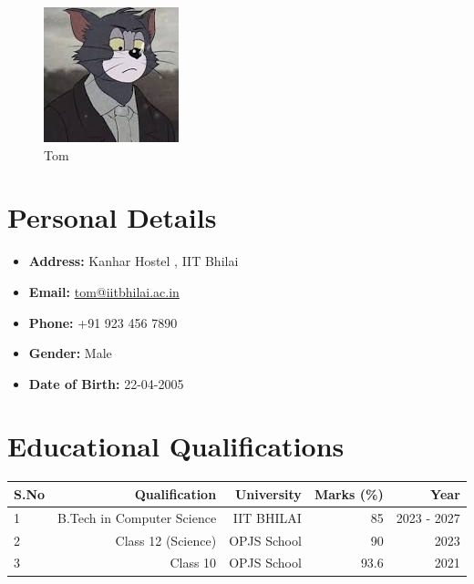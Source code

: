 \documentclass{article}
\begin{document}
	
	\begin{figure}[h]
		\centering
		\includegraphics[width=0.7\linewidth]{download2}
		\caption{Tom}
		\label{fig:download2}
	\end{figure}
	
	\section*{Personal Details}
	\begin{itemize}
		\item \textbf{Address:} Kanhar Hostel , IIT Bhilai
		\item \textbf{Email:} \href{mailto:tom@iitbhilai.ac.in}{tom@iitbhilai.ac.in}
		\item \textbf{Phone:} +91 923 456 7890
		\item \textbf{Gender:} Male
		\item \textbf{Date of Birth:} 22-04-2005
	\end{itemize}
	
	\section*{Educational Qualifications}
	\begin{center}
		\begin{tabular}{ | l | r | r | r | r | } 
			\hline
			\textbf{S.No} & \textbf{Qualification} & \textbf{University} & \textbf{Marks (\%)} & \textbf{Year} \\ 
			\hline
			1 & B.Tech in Computer Science & IIT BHILAI & 85 & 2023 - 2027 \\ 
			\hline
			2 & Class 12 (Science) & OPJS School & 90 & 2023 \\ 
			\hline
			3 & Class 10 & OPJS School & 93.6 & 2021 \\ 
			\hline
		\end{tabular}
	\end{center}
\end{document}
